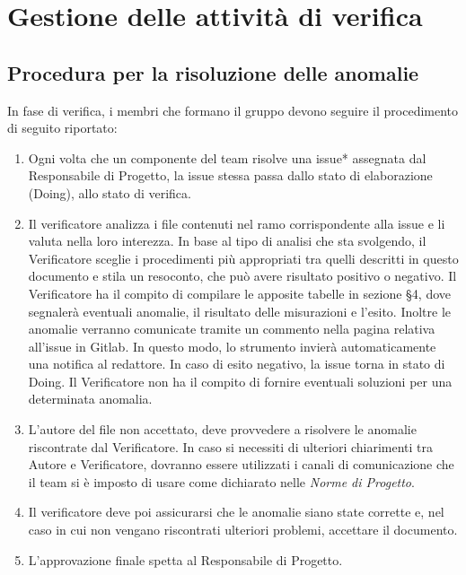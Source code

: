 \section{Gestione delle attività di verifica}
\subsection{Procedura per la risoluzione delle anomalie}
In fase di verifica, i membri che formano il gruppo devono seguire il procedimento di seguito riportato:
\begin{enumerate}
\item Ogni volta che un componente del team risolve una issue* assegnata dal Responsabile di Progetto, la issue stessa passa dallo stato di elaborazione (Doing), allo stato di verifica.
\item Il verificatore analizza i file contenuti nel ramo corrispondente alla issue e li valuta nella loro interezza. In base al tipo di analisi che sta svolgendo, il Verificatore sceglie i procedimenti più appropriati tra quelli descritti in questo documento e stila un resoconto, che può avere risultato positivo o negativo.
Il Verificatore ha il compito di compilare le apposite tabelle in sezione §4, dove segnalerà eventuali anomalie, il risultato delle misurazioni e l'esito. Inoltre le anomalie verranno comunicate tramite un commento nella pagina relativa all'issue in Gitlab. In questo modo, lo strumento invierà automaticamente una notifica al redattore. In caso di esito negativo, la issue torna in stato di Doing. Il Verificatore non ha il compito di fornire eventuali soluzioni per una determinata anomalia.
\item L'autore del file non accettato, deve provvedere a risolvere le anomalie riscontrate dal Verificatore. In caso si necessiti di ulteriori chiarimenti tra Autore e Verificatore, dovranno essere utilizzati i canali di comunicazione che il team si è imposto di usare come dichiarato nelle \textit{Norme di Progetto}.
\item Il verificatore deve poi assicurarsi che le anomalie siano state corrette e, nel caso in cui non vengano riscontrati ulteriori problemi, accettare il documento.
\item L'approvazione finale spetta al Responsabile di Progetto.
\end{enumerate}


